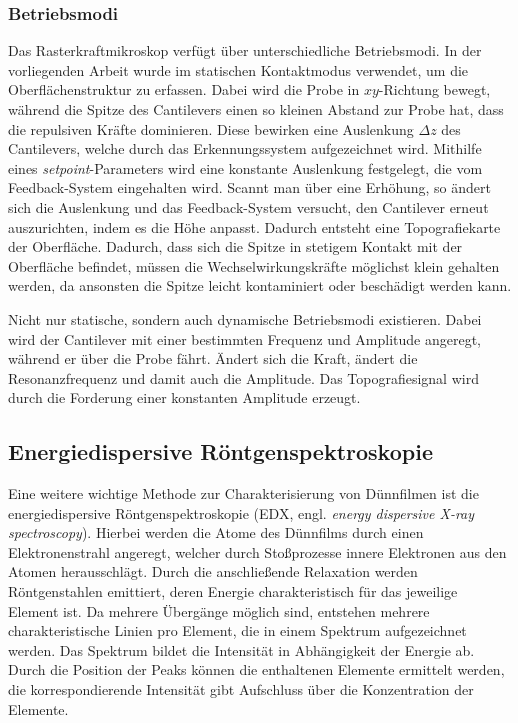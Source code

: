 \subsubsection{Betriebsmodi}
Das Rasterkraftmikroskop verfügt über unterschiedliche Betriebsmodi.
In der vorliegenden Arbeit wurde im statischen Kontaktmodus verwendet, um die Oberflächenstruktur zu erfassen.
Dabei wird die Probe in $xy$-Richtung bewegt, während die Spitze des Cantilevers einen so kleinen Abstand zur Probe hat,
dass die repulsiven Kräfte dominieren.
Diese bewirken eine Auslenkung $\Delta z$ des Cantilevers, welche durch das Erkennungssystem aufgezeichnet wird.
Mithilfe eines \textit{setpoint}-Parameters wird eine konstante Auslenkung festgelegt, die vom Feedback-System
eingehalten wird.
Scannt man über eine Erhöhung, so ändert sich die Auslenkung und das Feedback-System versucht, den Cantilever erneut
auszurichten, indem es die Höhe anpasst.
Dadurch entsteht eine Topografiekarte der Oberfläche.
Dadurch, dass sich die Spitze in stetigem Kontakt mit der Oberfläche befindet, müssen die Wechselwirkungskräfte
möglichst klein gehalten werden,
da ansonsten die Spitze leicht kontaminiert oder beschädigt werden kann.\autocite[199-201]{afm-buch}

Nicht nur statische, sondern auch dynamische Betriebsmodi existieren.
Dabei wird der Cantilever mit einer bestimmten Frequenz und Amplitude angeregt, während er über die Probe fährt.
Ändert sich die Kraft, ändert die Resonanzfrequenz und damit auch die Amplitude.
Das Topografiesignal wird durch die Forderung einer konstanten Amplitude erzeugt.\autocite[209]{afm-buch}


\subsection{Energiedispersive Röntgenspektroskopie}\label{sec:energiedispersive-rontgenspektroskopie}
Eine weitere wichtige Methode zur Charakterisierung von Dünnfilmen ist die energiedispersive Röntgenspektroskopie
(EDX, engl. \textit{energy dispersive X-ray spectroscopy}).
Hierbei werden die Atome des Dünnfilms durch einen Elektronenstrahl angeregt, welcher durch Stoßprozesse innere
Elektronen aus den Atomen herausschlägt.
Durch die anschließende Relaxation werden Röntgenstahlen emittiert, deren Energie charakteristisch für das jeweilige
Element ist.
Da mehrere Übergänge möglich sind, entstehen mehrere charakteristische Linien pro Element, die in einem Spektrum
aufgezeichnet werden.
Das Spektrum bildet die Intensität in Abhängigkeit der Energie ab.
Durch die Position der Peaks können die enthaltenen Elemente ermittelt werden,
die korrespondierende Intensität gibt Aufschluss über die Konzentration der Elemente.
\autocite[7-11]{edx}


